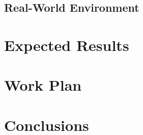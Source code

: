 \documentclass[a4paper, oneside]{article}
\begin{document}
    \subsection{Real-World Environment}
    \label{sec:Proposed Approach:Real World}
    

    
\section{Expected Results}
    \label{sec:Results:Expected Results}
    

\section{Work Plan}
    \label{sec:Work Plan}
    

\section{Conclusions}
    \label{sec:Conclusions}
    


\nocite{*} %
\printbibliography[heading=bibintoc]

\appendix
\end{document}
